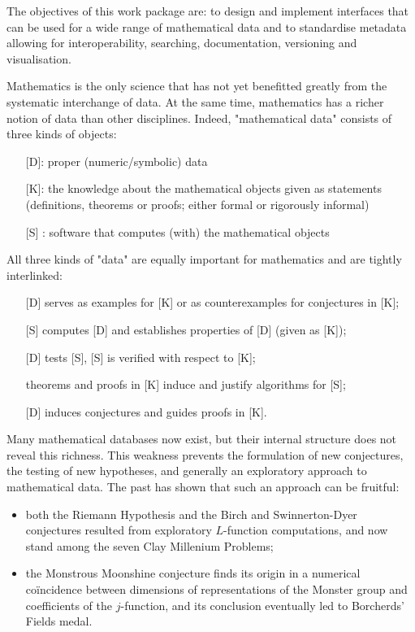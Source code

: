 \begin{workpackage}[id=dksbases,wphases=1-48!.5,
  title=Data/Knowledge/Software-Bases,
  ZHRM=1,JURM=36]

\begin{wpobjectives}
The objectives of this work package are: to design and implement interfaces that can be used for a wide range of mathematical data and to standardise metadata allowing for interoperability, searching, documentation, versioning and visualisation.
\end{wpobjectives}


\begin{wpdescription}
Mathematics is the only science that has not yet benefitted greatly from the systematic interchange of data. At the same time, mathematics has a richer notion of data than other disciplines.
Indeed, "mathematical data" consists of three kinds of objects:
\begin{itemize}
\item[] [D]: proper (numeric/symbolic) data
\item[] [K]:  the knowledge about the mathematical objects given as statements (definitions, theorems or proofs; either formal or rigorously informal)
\item[] [S] : software that computes (with) the mathematical objects
\end{itemize}

All three kinds of "data" are equally important for mathematics and are tightly interlinked:
\begin{itemize}
\item[] [D] serves as examples for [K] or as counterexamples for conjectures in [K];
\item[] [S] computes [D] and establishes properties of [D] (given as [K]);
\item[] [D] tests [S], [S] is verified with respect to [K];
\item[] theorems and proofs in [K] induce and justify algorithms for [S];
\item[] [D] induces conjectures and guides proofs in [K].
\end{itemize}

Many mathematical databases now exist, but their internal structure does not reveal this richness. This weakness prevents the formulation of new conjectures, the testing of new hypotheses, and generally an exploratory approach to mathematical data. The past has shown that such an approach can be fruitful: 
\begin{itemize}
\item both the Riemann Hypothesis and the Birch and Swinnerton-Dyer conjectures resulted from exploratory $L$-function computations, and now stand among the seven Clay Millenium Problems;
\item the Monstrous Moonshine conjecture finds its origin in a numerical co\"incidence between dimensions of representations of the Monster group and coefficients of the $j$-function, and its conclusion eventually led to Borcherds' Fields medal.
\end{itemize}


\end{wpdescription}
\end{workpackage}
